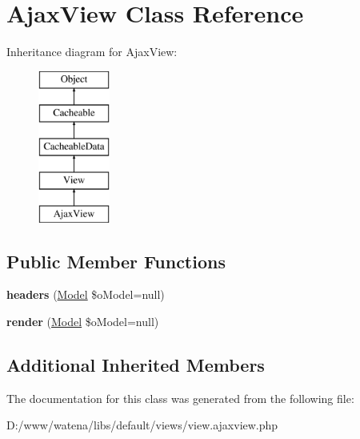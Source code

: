 \hypertarget{class_ajax_view}{\section{Ajax\-View Class Reference}
\label{class_ajax_view}
}
Inheritance diagram for Ajax\-View\-:\begin{figure}[H]
\begin{center}
\leavevmode
\includegraphics[height=5.000000cm]{class_ajax_view}
\end{center}
\end{figure}
\subsection*{Public Member Functions}
\begin{DoxyCompactItemize}
\item 
\hypertarget{class_ajax_view_a881913c11afa5d32a41a12200895edd4}{{\bfseries headers} (\hyperlink{class_model}{Model} \$o\-Model=null)}\label{class_ajax_view_a881913c11afa5d32a41a12200895edd4}

\item 
\hypertarget{class_ajax_view_a7d7c31de91cd9e2c768772102f1e0df7}{{\bfseries render} (\hyperlink{class_model}{Model} \$o\-Model=null)}\label{class_ajax_view_a7d7c31de91cd9e2c768772102f1e0df7}

\end{DoxyCompactItemize}
\subsection*{Additional Inherited Members}


The documentation for this class was generated from the following file\-:\begin{DoxyCompactItemize}
\item 
D\-:/www/watena/libs/default/views/view.\-ajaxview.\-php\end{DoxyCompactItemize}
